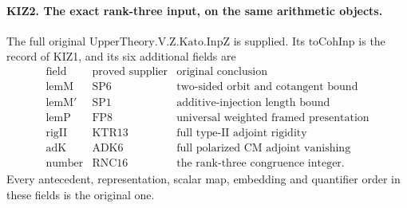 \documentclass[11pt,a4paper]{article}
\numberwithin{equation}{section}
\theoremstyle{remark}\newtheorem{remark}[theorem]{Remark}
\begin{document}

\paragraph{KIZ2. The exact rank-three input, on the same arithmetic objects.}
\label{claim:KIZ2}
The full original \(\mathrm{UpperTheory.V.Z.Kato.InpZ}\) is
supplied.  Its \(\mathrm{toCohInp}\) is the record of KIZ1,
and its six additional fields are
\[
\begin{array}{c|c|l}
\text{field}&\text{proved supplier}&\text{original conclusion}\\ \hline
\mathrm{lemM}&\mathrm{SP6}&\text{two-sided orbit and cotangent bound}\\
\mathrm{lemM'}&\mathrm{SP1}&\text{additive-injection length bound}\\
\mathrm{lemP}&\mathrm{FP8}&\text{universal weighted framed presentation}\\
\mathrm{rigII}&\mathrm{KTR13}&\text{full type-II adjoint rigidity}\\
\mathrm{adK}&\mathrm{ADK6}&\text{full polarized CM adjoint vanishing}\\
\mathrm{number}&\mathrm{RNC16}&\text{the rank-three congruence integer}.
\end{array}
\tag{KIZ.2}
\]
Every antecedent, representation, scalar map, embedding and
quantifier order in these fields is the original one.
\end{document}
